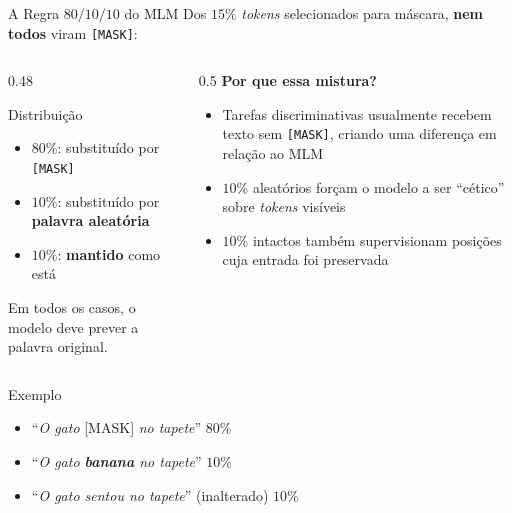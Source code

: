 \documentclass[aspectratio=169, xcolor=dvipsnames]{beamer}
\begin{document}
  \begin{frame}{A Regra $80/10/10$ do MLM}
    Dos $15\%$ \textit{tokens} selecionados para máscara, \textbf{nem todos} viram \texttt{[MASK]}:
    \vspace{0.2em}
    \begin{columns}
      \begin{column}{0.48\textwidth}
        \begin{block}{Distribuição}
          \begin{itemize}\setlength{\itemsep}{1pt}
            \item \textbf{$80\%$}: substituído por \texttt{[MASK]}
            \item \textbf{$10\%$}: substituído por \textbf{palavra aleatória}
            \item \textbf{$10\%$}: \textbf{mantido} como está
          \end{itemize}
          \vspace{0.1em}
          {\small Em todos os casos, o modelo deve prever a palavra original.}
        \end{block}
      \end{column}
      \begin{column}{0.5\textwidth}
        \textbf{Por que essa mistura?}
        \begin{itemize}\small\setlength{\itemsep}{1pt}
          \item Tarefas discriminativas usualmente recebem texto sem \texttt{[MASK]}, criando uma diferença em relação ao MLM
          \item $10\%$ aleatórios forçam o modelo a ser ``cético'' sobre \textit{tokens} visíveis
          \item $10\%$ intactos também supervisionam posições cuja entrada foi preservada
        \end{itemize}
      \end{column}
    \end{columns}
    \vspace{0.2em}
    \begin{exampleblock}{Exemplo}\small
      \begin{itemize}\setlength{\itemsep}{1pt}
        \item ``\textit{O gato} [MASK] \textit{no tapete}'' \hfill $80\%$
        \item ``\textit{O gato \textbf{banana} no tapete}'' \hfill $10\%$
        \item ``\textit{O gato sentou no tapete}'' (inalterado) \hfill $10\%$
      \end{itemize}
    \end{exampleblock}
  \end{frame}
\end{document}

